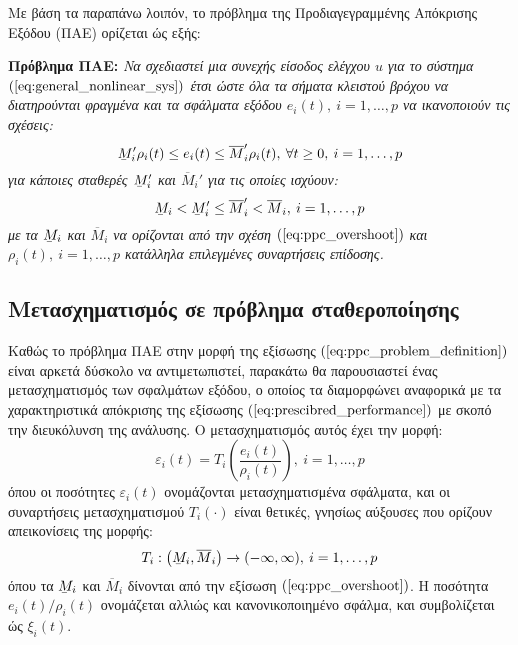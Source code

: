 Με βάση τα παραπάνω λοιπόν, το πρόβλημα της Προδιαγεγραμμένης Απόκρισης Εξόδου (ΠΑΕ) ορίζεται ώς εξής: 
\pagebreak


\textbf{Πρόβλημα ΠΑΕ:}
\textit{ Να σχεδιαστεί μια συνεχής είσοδος ελέγχου $u$ για το σύστημα $(\ref{eq:general_nonlinear_sys})$ έτσι ώστε όλα τα σήματα κλειστού βρόχου να διατηρούνται φραγμένα και τα σφάλματα εξόδου $e_i(t), \: i = 1,\dots ,p$ να ικανοποιούν τις σχέσεις:
\begin{equation}
	\barbelow{M}_i' \rho_i(t) \leq e_i(t) \leq \overline{M}_i'  \rho_i(t),
	\: \forall t \geq 0, \: i = 1,\dots ,p
	\label{eq:ppc_problem_definition}
\end{equation}
για κάποιες σταθερές $\barbelow{M}_i'$ και $\overline{M}_i'$ για τις οποίες ισχύουν:
\begin{equation*}
	\barbelow{M}_i < \barbelow{M}_i' \leq \overline{M}_i' < \overline{M}_i, \: i = 1,\dots ,p
\end{equation*}
με τα $\barbelow{M}_i$ και $\overline{M}_i$ να ορίζονται από την σχέση $(\ref{eq:ppc_overshoot})$ και $\rho_i(t), \: i = 1,\dots ,p$ κατάλληλα επιλεγμένες συναρτήσεις επίδοσης.
}

\subsection{Μετασχηματισμός σε πρόβλημα σταθεροποίησης}
Καθώς το πρόβλημα ΠΑΕ στην μορφή της εξίσωσης $(\ref{eq:ppc_problem_definition})$ είναι αρκετά δύσκολο να αντιμετωπιστεί, παρακάτω θα παρουσιαστεί ένας μετασχηματισμός των σφαλμάτων εξόδου, ο οποίος τα διαμορφώνει αναφορικά με τα χαρακτηριστικά απόκρισης της εξίσωσης $(\ref{eq:prescibred_performance})$ με σκοπό την διευκόλυνση της ανάλυσης. Ο μετασχηματισμός αυτός έχει την μορφή:
\begin{equation}
	\varepsilon_i(t) = T_i \left( \frac{e_i(t)}{\rho_i(t)} \right)
	, \: i = 1,\dots ,p
	\label{eq:ppc_trasformation_error}
\end{equation}
όπου οι ποσότητες $\varepsilon_i(t)$ ονομάζονται μετασχηματισμένα σφάλματα, και οι συναρτήσεις μετασχηματισμού $T_i(\cdot)$ είναι θετικές, γνησίως αύξουσες που ορίζουν απεικονίσεις της μορφής:
\begin{equation*}
	T_i: \left( \barbelow{M}_i, \overline{M}_i\right) \rightarrow 
	(- \infty, \infty), \: i = 1,\dots ,p
\end{equation*}
όπου τα $\barbelow{M}_i$ και  $\overline{M}_i$ δίνονται από την εξίσωση $(\ref{eq:ppc_overshoot})$. Η ποσότητα $e_i(t)/\rho_i(t)$ ονομάζεται αλλιώς και κανονικοποιημένο σφάλμα, και συμβολίζεται ώς $\xi_i(t)$.

